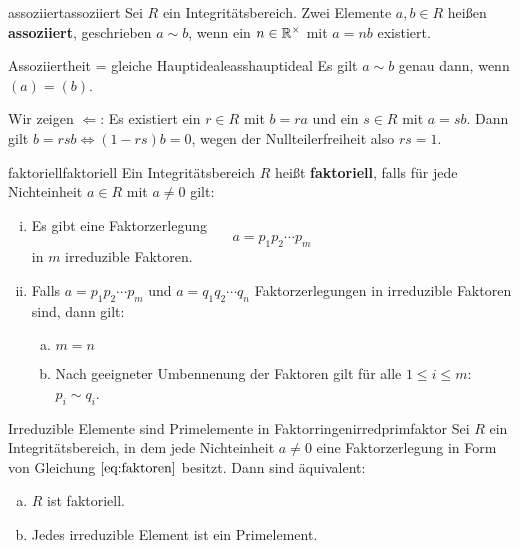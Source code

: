 \begin{definition}{assoziiert}{assoziiert}
Sei $R$ ein Integritätsbereich. Zwei Elemente $a,b \in R$ heißen \textbf{assoziiert}, geschrieben $a \sim b$, wenn ein $n \in \mathbb{R}^\times$ mit $a = nb$ existiert.
\end{definition}
\begin{satz}{Assoziiertheit = gleiche Hauptideale}{asshauptideal}
Es gilt $a \sim b$ genau dann, wenn $(a) = (b)$.
\end{satz}
\begin{beweis}
Wir zeigen $\Leftarrow$: Es existiert ein $r \in R$ mit $b =ra$ und ein $s \in R$ mit $a = sb$. Dann gilt $b=rsb \iff (1-rs) b = 0$, wegen der Nullteilerfreiheit also $rs=1$.
\end{beweis}
\begin{definition}{faktoriell}{faktoriell}
Ein Integritätsbereich $R$ heißt \textbf{faktoriell}, falls für jede Nichteinheit $a \in R$ mit $a \neq 0 $ gilt:
\begin{enumerate}[(i)]
\item Es gibt eine Faktorzerlegung 
\begin{equation}
\label{eq:faktoren}
a = p_1p_2 \cdots p_m
\end{equation}
in $m$ irreduzible Faktoren.
\item Falls $a = p_1p_2 \cdots p_m$ und $a = q_1 q_2 \cdots q_n$ Faktorzerlegungen in irreduzible Faktoren sind, dann gilt:
\begin{enumerate}[(a)]
\item $m = n$
\item Nach geeigneter Umbennenung der Faktoren gilt für alle $1 \leq i \leq m$: $p_i \sim q_i$.
\end{enumerate}
\end{enumerate}
\end{definition}
\begin{satz}{Irreduzible Elemente sind Primelemente in Faktorringen}{irredprimfaktor}
Sei $R$ ein Integritätsbereich, in dem jede Nichteinheit $a \neq 0$ eine Faktorzerlegung in Form von Gleichung $\ref{eq:faktoren}$ besitzt. Dann sind äquivalent:
\begin{enumerate}[(a)]
\item $R$ ist faktoriell.
\item Jedes irreduzible Element ist ein Primelement.
\end{enumerate}
\end{satz}

